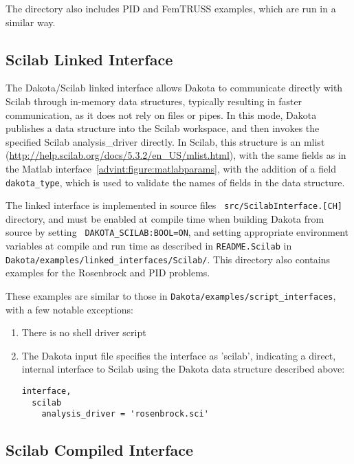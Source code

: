 The directory also includes PID and FemTRUSS examples, which are run
in a similar way.

\subsection{Scilab Linked Interface} 

The Dakota/Scilab linked interface allows Dakota to communicate
directly with Scilab through in-memory data structures, typically
resulting in faster communication, as it does not rely on files or
pipes. In this mode, Dakota publishes a data structure into the
Scilab workspace, and then invokes the specified Scilab
analysis\_driver directly. In Scilab, this structure is an mlist
(\url{http://help.scilab.org/docs/5.3.2/en\_US/mlist.html}), with the same
fields as in the Matlab interface~\ref{advint:figure:matlabparams},
with the addition of a field {\tt dakota\_type}, which is used to validate
the names of fields in the data structure.

The linked interface is implemented in source files {\tt
  src/ScilabInterface.[CH]} directory, and must be enabled at compile
time when building Dakota from source by setting {\tt
  DAKOTA\_SCILAB:BOOL=ON}, and setting appropriate environment
variables at compile and run time as described in {\tt README.Scilab}
in \\ {\tt Dakota/examples/linked\_interfaces/Scilab/}. This directory also
contains examples for the Rosenbrock and PID problems.

These examples are similar to those in {\tt Dakota/examples/script\_interfaces}, with
a few notable exceptions:
\begin{enumerate}
\item There is no shell driver script
\item The Dakota input file specifies the interface as 'scilab',
  indicating a direct, internal interface to Scilab using the Dakota
  data structure described above:
\begin{small}
\begin{verbatim}
interface,
  scilab
    analysis_driver = 'rosenbrock.sci'
\end{verbatim} 
\end{small}
\end{enumerate}


\subsection{Scilab Compiled Interface} 

